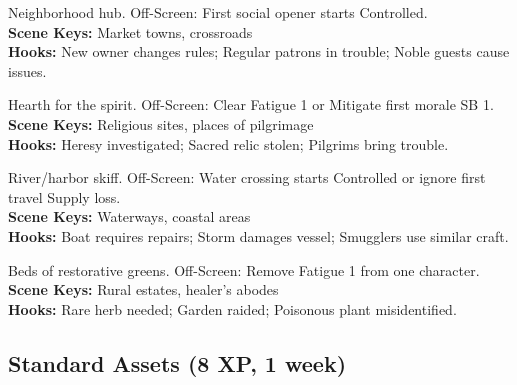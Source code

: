 \documentclass[12pt]{article}
\begin{document}
\begin{description}[leftmargin=*]
  \item[\textbf{Local Tavern/Inn}] Neighborhood hub. Off-Screen: First social opener starts Controlled. \\
  \textbf{Scene Keys:} Market towns, crossroads \\
  \textbf{Hooks:} New owner changes rules; Regular patrons in trouble; Noble guests cause issues.

  \item[\textbf{Minor Shrine/Temple}] Hearth for the spirit. Off-Screen: Clear Fatigue 1 or Mitigate first morale SB 1. \\
  \textbf{Scene Keys:} Religious sites, places of pilgrimage \\
  \textbf{Hooks:} Heresy investigated; Sacred relic stolen; Pilgrims bring trouble.

  \item[\textbf{Fishing Boat/Barge}] River/harbor skiff. Off-Screen: Water crossing starts Controlled or ignore first travel Supply loss. \\
  \textbf{Scene Keys:} Waterways, coastal areas \\
  \textbf{Hooks:} Boat requires repairs; Storm damages vessel; Smugglers use similar craft.

  \item[\textbf{Herbal Garden}] Beds of restorative greens. Off-Screen: Remove Fatigue 1 from one character. \\
  \textbf{Scene Keys:} Rural estates, healer's abodes \\
  \textbf{Hooks:} Rare herb needed; Garden raided; Poisonous plant misidentified.
\end{description}

\subsection*{Standard Assets (8 XP, 1 week)}
\end{document}
